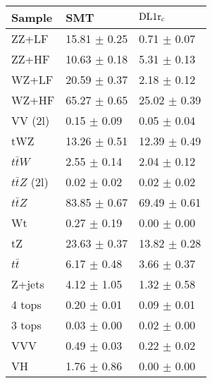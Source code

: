 \documentclass[10pt]{article}
\begin{document}
	\begin{table}[]
		\begin{tabular}{|l|l|l|}
		\hline
		\textbf{Sample}                  	& \textbf{SMT}     & $\bf{\mathrm{DL1r_{c}}}$ \\
		\hline                                                                          
		ZZ+LF                 				&  15.81 $\pm$ 0.25 	   &   0.71 $\pm$ 0.07          \\   
		ZZ+HF                 				&  10.63 $\pm$ 0.18 	   &   5.31 $\pm$ 0.13         \\   
		WZ+LF                  				&  20.59 $\pm$ 0.37 	   &   2.18 $\pm$ 0.12         \\   
		WZ+HF                  				&  65.27 $\pm$ 0.65 	   &   25.02 $\pm$ 0.39         \\   
		VV (2l)                 			&  0.15 $\pm$ 0.09  	   &   0.05 $\pm$ 0.04                             \\   
		tWZ                       			&  13.26 $\pm$ 0.51 	   &   12.39 $\pm$ 0.49                                \\   
		$t\bar{t}W$             			&  2.55 $\pm$ 0.14  	   &   2.04 $\pm$ 0.12                             \\   
		$t\bar{t}Z$ (2l)       				&  0.02 $\pm$ 0.02  	   &   0.02 $\pm$ 0.02                             \\   
		$t\bar{t}Z$           				&  83.85 $\pm$ 0.67 	   &  69.49 $\pm$ 0.61   \\   
		Wt                      			&  0.27 $\pm$ 0.19  	   &   0.00 $\pm$ 0.00                           \\   
		tZ                      			&  23.63 $\pm$ 0.37 	   &   13.82 $\pm$ 0.28                            \\     
		$t\bar{t}$             				&  6.17 $\pm$ 0.48  	   &   3.66 $\pm$ 0.37                            \\   
		Z+jets                 				&  4.12 $\pm$ 1.05  	   &   1.32 $\pm$ 0.58                            \\   
		4 tops                 				&  0.20 $\pm$ 0.01  	   &   0.09 $\pm$ 0.01                           \\   
		3 tops                 				&  0.03 $\pm$ 0.00  	   &   0.02 $\pm$ 0.00                           \\   
		VVV                     			&  0.49 $\pm$ 0.03  	   &   0.22 $\pm$ 0.02                           \\   
		VH                      			&  1.76 $\pm$ 0.86  	   &   0.00 $\pm$ 0.00                           \\   

\end{tabular}
\end{table}
\end{document}
